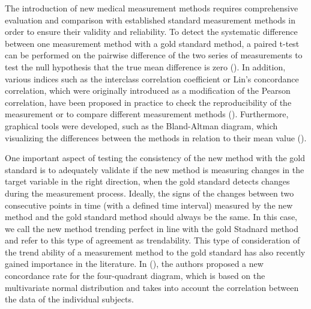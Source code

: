 
The introduction of new medical measurement methods requires comprehensive evaluation and comparison with established standard measurement methods in order to ensure their validity and reliability. 
To detect the systematic difference between one measurement method with a gold standard method, a paired t-test can be performed on the pairwise difference of the two series of measurements to test the null hypothesis that the true mean difference is zero (\cite{watson2010method}).
In addition, various indices such as the interclass correlation coefficient or Lin's concordance correlation, which were originally introduced as a modification of the Pearson correlation, have been proposed in practice to check the reproducibility of the measurement or to compare different measurement methods (\cite{lawrence1989concordance,koo2016guideline}). 
Furthermore, graphical tools were developed, such as the Bland-Altman diagram, which visualizing the differences between the methods in relation to their mean value (\cite{bland1986statistical}).

One important aspect of testing the consistency of the new method with the gold standard is to adequately validate if the new method is measuring changes in the target variable in the right direction, when the gold standard detects changes during the measurement process. 
Ideally, the signs of the changes between two consecutive points in time (with a defined time interval) measured by the new method and the gold standard method should always be the same. 
In this case, we call the new method trending perfect in line with the gold Stadnard method and refer to this type of agreement as trendability. 
This type of consideration of the trend ability of a measurement method to the gold standard has also recently gained importance in the literature. 
In (\cite{hiraishi2021concordance}), the authors proposed a new concordance rate for the four-quadrant diagram, which is based on the multivariate normal distribution and takes into account the correlation between the data of the individual subjects.

